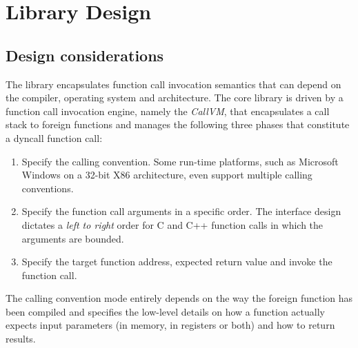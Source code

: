 %
%
%
%

\newpage
\section{Library Design}


\subsection{Design considerations}

The  library encapsulates function call invocation semantics
that can depend on the compiler, operating system and architecture.
The core library is driven by a function call invocation engine, 
namely the \emph{CallVM}, that encapsulates a call stack to foreign functions 
and manages the following three phases that constitute a dyncall function call:

\begin{enumerate}
\item Specify the calling convention. Some run-time platforms, such as
Microsoft Windows on a 32-bit X86 architecture, even support multiple calling
conventions.
\item Specify the function call arguments in a specific order. The 
interface design dictates a \emph{left to right} order for C and C++ function 
calls in which the arguments are bounded.
\item Specify the target function address, expected return value and 
invoke the function call.
\end{enumerate}

The calling convention mode entirely depends on the way the foreign function
has been compiled and specifies the low-level details on how a function
actually expects input parameters (in memory, in registers or both) and how to
return results.


